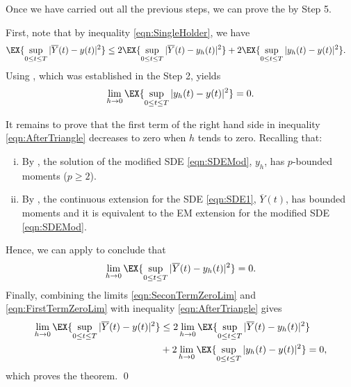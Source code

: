 	Once we have carried out all the previous steps, we can prove the  by Step 5.%
\begin{pf}
	First,  note that by inequality \eqref{eqn:SingleHolder}, we have
	\begin{align}\label{eqn:AfterTriangle}
		\EX{\sup_{0\leq t \leq T}|\overline{Y}(t) - y(t)|^2}
		&\leq
		2\EX{
			\sup_{0\leq t \leq T}
			|\overline{Y}(t) - y_h(t)|^2
		}
		+
		2\EX{
			\sup_{0\leq t \leq T}
			|y_h(t) - y(t)|^2
		}.
	\end{align}
	Using , which was established in the Step 2, yields
	\begin{equation}\label{eqn:SeconTermZeroLim}
		\lim_{h\to 0}
		\EX{
			\sup_{0\leq t \leq T}
			|y_h(t) - y(t)|^2
		} = 0.
	\end{equation}
	
		It remains to prove that the first term of the right hand side in inequality \eqref{eqn:AfterTriangle} 
		decreases to zero
	when $h$ tends to zero. Recalling that:
	\begin{enumerate}[i)]
		\item 
			By , the solution of the modified SDE \eqref{eqn:SDEMod}, $y_h$, has
			$p$-bounded moments ($p\geq 2$).
		\item
			By , the \SM continuous extension for the SDE \eqref{eqn:SDE1},
			$\overline{Y}(t)$, has bounded moments and it is equivalent to the EM extension for the modified SDE 
			\eqref{eqn:SDEMod}.
	\end{enumerate}
	Hence, we can apply 
	 to conclude that
	\begin{equation}\label{eqn:FirstTermZeroLim}
		\lim_{h\to 0}
		\EX{
			\sup_{0\leq t \leq T}
			|\overline{Y}(t) - y_h(t)|^2
		} = 0.
	\end{equation}
	Finally, combining the limits \eqref{eqn:SeconTermZeroLim} and \eqref{eqn:FirstTermZeroLim} with 
	inequality \eqref{eqn:AfterTriangle} gives
	\begin{align*}
		\lim_{h \to 0}
		\EX{
			\sup_{0\leq t \leq T}
			|\overline{Y}(t) - y(t)|^2
		}
		&\leq	
		2\lim_{h\to 0}
		\EX{
			\sup_{0\leq t \leq T}
			|\overline{Y}(t) - y_h(t)|^2
		}
		\\
		&
		+
		2\lim_{h\to 0}
		\EX{
			\sup_{0\leq t \leq T}
			|y_h(t) - y(t)|^2
		} = 0,
	\end{align*}
	which proves the theorem. \qed
\end{pf}
%